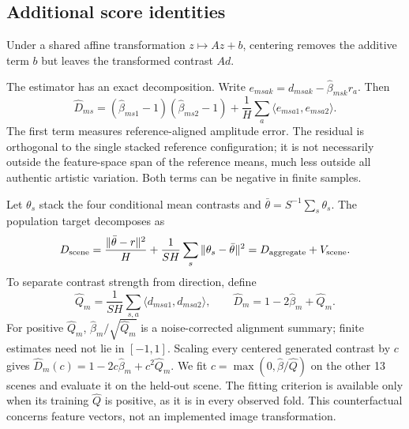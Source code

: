 \subsection{Additional score identities}\label{app:score-details}
Under a shared affine transformation $z\mapsto Az+b$, centering removes
the additive term $b$ but leaves the transformed contrast $Ad$.

The estimator has an exact decomposition. Write
$e_{msak}=d_{msak}-\widehat\beta_{msk}r_a$. Then
\begin{equation}
 \widehat D_{ms}=
 (\widehat\beta_{ms1}-1)(\widehat\beta_{ms2}-1)
 +\frac1H\sum_a\langle e_{msa1},e_{msa2}\rangle.
 \label{eq:decomposition}
\end{equation}
The first term measures reference-aligned amplitude error. The residual is
orthogonal to the single stacked reference configuration; it is not necessarily
outside the feature-space span of the reference means, much less outside all
authentic artistic variation. Both terms can be negative in finite samples.

Let $\theta_s$ stack the four conditional mean contrasts and
$\bar\theta=S^{-1}\sum_s\theta_s$. The population target decomposes as
\begin{equation}
 D_{\rm scene}=\frac{\|\bar\theta-r\|^2}{H}
 +\frac1{SH}\sum_s\|\theta_s-\bar\theta\|^2
 =D_{\rm aggregate}+V_{\rm scene}.
 \label{eq:scene-decomposition}
\end{equation}
To separate contrast strength from direction, define
\begin{equation}
 \widehat Q_m=\frac1{SH}\sum_{s,a}\langle d_{msa1},d_{msa2}\rangle,
 \qquad \widehat D_m=1-2\widehat\beta_m+\widehat Q_m.
 \label{eq:magnitude}
\end{equation}
For positive $\widehat Q_m$, $\widehat\beta_m/\sqrt{\widehat Q_m}$ is a
noise-corrected alignment summary; finite estimates need not lie in $[-1,1]$.
Scaling every centered generated contrast by $c$ gives
$\widehat D_m(c)=1-2c\widehat\beta_m+c^2\widehat Q_m$.
We fit $c=\max(0,\widehat\beta/\widehat Q)$ on the other 13 scenes and evaluate
it on the held-out scene. The fitting criterion is available only when its
training $\widehat Q$ is positive, as it is in every observed fold. This
counterfactual concerns feature vectors, not an implemented image transformation.

